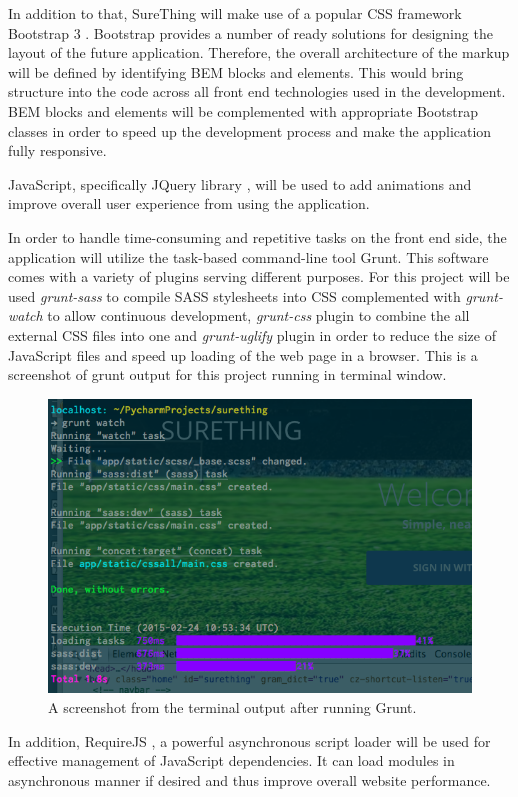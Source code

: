 In addition to that, SureThing will make use of a popular CSS framework Bootstrap 3 \cite{documentation:Bootstrap3}. Bootstrap provides a number of ready solutions for designing the layout of the future application. Therefore, the overall architecture of the markup will be defined by identifying BEM blocks and elements. This would bring structure into the code across all front end technologies used in the development. BEM blocks and elements will be complemented with appropriate Bootstrap classes in order to speed up the development process and make the application fully responsive.
 
JavaScript, specifically JQuery library \cite{documentation:jQuery}, will be used to add animations and improve overall user experience from using the application.  

In order to handle time-consuming and repetitive tasks on the front end side, the application will utilize the task-based command-line tool Grunt. This software comes with a variety of plugins serving different purposes. For this project will be used \emph{grunt-sass} to compile SASS stylesheets into CSS complemented with \emph{grunt-watch} to allow continuous development, \emph{grunt-css} plugin to combine the all external CSS files into one and \emph{grunt-uglify} plugin in order to reduce the size of JavaScript files and speed up loading of the web page in a browser. This is a screenshot of grunt output for this project running in terminal window.

\begin{figure}[H]
	\begin{center}
		\includegraphics[width=.60\linewidth,natwidth=610,natheight=540]{impl/images/gruntInAction}
		\caption{A screenshot from the terminal output after running Grunt.} \label{fig:using:gruntInAction}
	\end{center}
\end{figure}
	
In addition, RequireJS  \cite{documentation:RequireJS}, a powerful asynchronous script loader will be used for effective management of JavaScript dependencies. It can load modules in asynchronous manner if desired and thus improve overall website performance.


